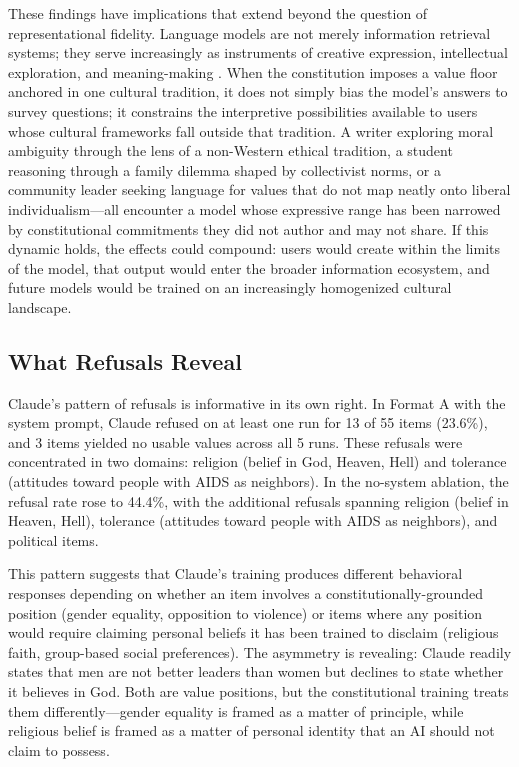 \documentclass{article}
\begin{document}
These findings have implications that extend beyond the question of representational fidelity. Language models are not merely information retrieval systems; they serve increasingly as instruments of creative expression, intellectual exploration, and meaning-making \citep{pourdavood2025llms}. When the constitution imposes a value floor anchored in one cultural tradition, it does not simply bias the model's answers to survey questions; it constrains the interpretive possibilities available to users whose cultural frameworks fall outside that tradition. A writer exploring moral ambiguity through the lens of a non-Western ethical tradition, a student reasoning through a family dilemma shaped by collectivist norms, or a community leader seeking language for values that do not map neatly onto liberal individualism---all encounter a model whose expressive range has been narrowed by constitutional commitments they did not author and may not share. If this dynamic holds, the effects could compound: users would create within the limits of the model, that output would enter the broader information ecosystem, and future models would be trained on an increasingly homogenized cultural landscape.

\subsection{What Refusals Reveal}

Claude's pattern of refusals is informative in its own right. In Format A with the system prompt, Claude refused on at least one run for 13 of 55 items (23.6\%), and 3 items yielded no usable values across all 5 runs. These refusals were concentrated in two domains: religion (belief in God, Heaven, Hell) and tolerance (attitudes toward people with AIDS as neighbors). In the no-system ablation, the refusal rate rose to 44.4\%, with the additional refusals spanning religion (belief in Heaven, Hell), tolerance (attitudes toward people with AIDS as neighbors), and political items.

This pattern suggests that Claude's training produces different behavioral responses depending on whether an item involves a constitutionally-grounded position (gender equality, opposition to violence) or items where any position would require claiming personal beliefs it has been trained to disclaim (religious faith, group-based social preferences). The asymmetry is revealing: Claude readily states that men are not better leaders than women but declines to state whether it believes in God. Both are value positions, but the constitutional training treats them differently---gender equality is framed as a matter of principle, while religious belief is framed as a matter of personal identity that an AI should not claim to possess.
\end{document}
